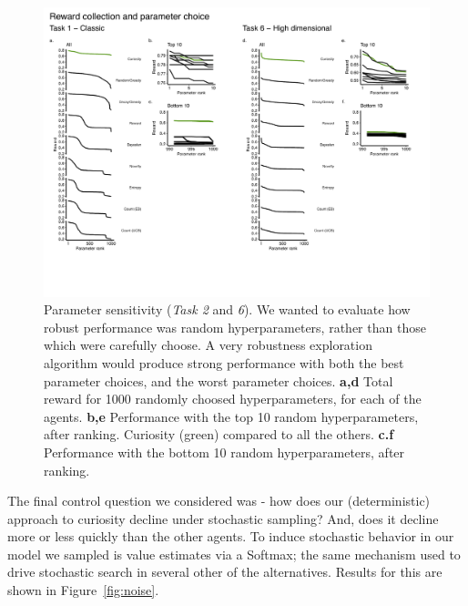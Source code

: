\begin{figure}
	\begin{fullwidth}
	\includegraphics[width=1\linewidth]{img/robust.pdf} 
	\caption{Parameter sensitivity (\textit{Task 2} and \textit{6}). We wanted to evaluate how robust performance was random hyperparameters, rather than those which were carefully choose. A very robustness exploration algorithm would produce strong performance with both the best parameter choices, and the worst parameter choices. 
	\textbf{a,d} Total reward for 1000 randomly choosed hyperparameters, for each of the agents.
	\textbf{b,e} Performance with the top 10 random hyperparameters, after ranking. Curiosity (green) compared to all the others.
	\textbf{c.f} Performance with the bottom 10 random hyperparameters, after ranking.
	}
	\label{fig:robust}
	\end{fullwidth}
\end{figure}

The final control question we considered was - how does our (deterministic) approach to curiosity decline under stochastic sampling? And, does it decline more or less quickly than the other agents. To induce stochastic behavior in our model we sampled is value estimates via a Softmax; the same mechanism used to drive stochastic search in several other of the alternatives. Results for this are shown in Figure~\ref{fig:noise}.

